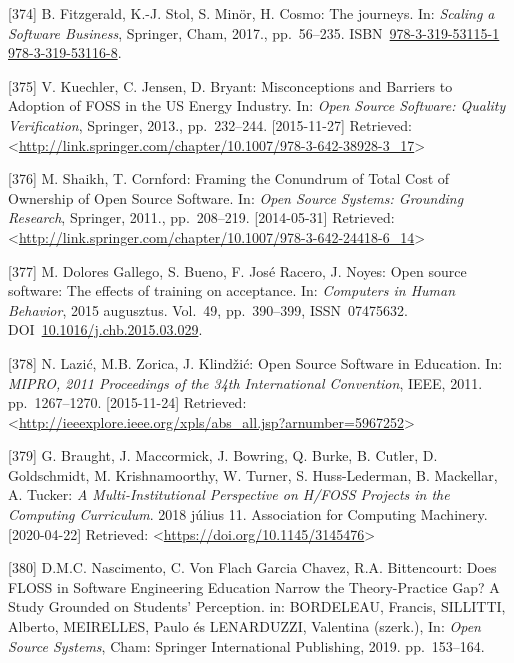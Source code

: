 \documentclass[12pt,magyar,a4paper,oneside]{scrreprt}
\newenvironment{cslreferences}%
  {}%
  {\par}
\begin{document}
\begin{cslreferences}
\leavevmode\hypertarget{ref-fitzgerald_journeys_2017}{}%
{[}374{]} B. Fitzgerald, K.-J. Stol, S. Minör, H. Cosmo: The journeys.
In: \emph{Scaling a Software Business}, Springer, Cham, 2017.,
pp.~56--235.
ISBN~\href{https://worldcat.org/isbn/978-3-319-53115-1\%20978-3-319-53116-8}{978-3-319-53115-1 978-3-319-53116-8}.

\leavevmode\hypertarget{ref-kuechler_misconceptions_2013}{}%
{[}375{]} V. Kuechler, C. Jensen, D. Bryant: Misconceptions and Barriers
to Adoption of FOSS in the US Energy Industry. In: \emph{Open Source
Software: Quality Verification}, Springer, 2013., pp.~232--244.
{[}2015-11-27{]} Retrieved:
\textless{}\url{http://link.springer.com/chapter/10.1007/978-3-642-38928-3_17}\textgreater{}

\leavevmode\hypertarget{ref-shaikh_framing_2011}{}%
{[}376{]} M. Shaikh, T. Cornford: Framing the Conundrum of Total Cost of
Ownership of Open Source Software. In: \emph{Open Source Systems:
Grounding Research}, Springer, 2011., pp.~208--219. {[}2014-05-31{]}
Retrieved:
\textless{}\url{http://link.springer.com/chapter/10.1007/978-3-642-24418-6_14}\textgreater{}

\leavevmode\hypertarget{ref-dolores_gallego_open_2015}{}%
{[}377{]} M. Dolores Gallego, S. Bueno, F. José Racero, J. Noyes: Open
source software: The effects of training on acceptance. In:
\emph{Computers in Human Behavior}, 2015 augusztus. Vol.~49,
pp.~390--399, ISSN~07475632.
DOI~\href{https://doi.org/10.1016/j.chb.2015.03.029}{10.1016/j.chb.2015.03.029}.

\leavevmode\hypertarget{ref-lazic_open_2011}{}%
{[}378{]} N. Lazić, M.B. Zorica, J. Klindžić: Open Source Software in
Education. In: \emph{MIPRO, 2011 Proceedings of the 34th International
Convention}, IEEE, 2011. pp.~1267--1270. {[}2015-11-24{]} Retrieved:
\textless{}\url{http://ieeexplore.ieee.org/xpls/abs_all.jsp?arnumber=5967252}\textgreater{}

\leavevmode\hypertarget{ref-braught_multi-institutional_2018}{}%
{[}379{]} G. Braught, J. Maccormick, J. Bowring, Q. Burke, B. Cutler, D.
Goldschmidt, M. Krishnamoorthy, W. Turner, S. Huss-Lederman, B.
Mackellar, A. Tucker: \emph{A Multi-Institutional Perspective on H/FOSS
Projects in the Computing Curriculum}. 2018 július 11. Association for
Computing Machinery. {[}2020-04-22{]} Retrieved:
\textless{}\url{https://doi.org/10.1145/3145476}\textgreater{}

\leavevmode\hypertarget{ref-nascimento_does_2019}{}%
{[}380{]} D.M.C. Nascimento, C. Von Flach Garcia Chavez, R.A.
Bittencourt: Does FLOSS in Software Engineering Education Narrow the
Theory-Practice Gap? A Study Grounded on Students' Perception. in:
BORDELEAU, Francis, SILLITTI, Alberto, MEIRELLES, Paulo és LENARDUZZI,
Valentina (szerk.), In: \emph{Open Source Systems}, Cham: Springer
International Publishing, 2019. pp.~153--164.


\end{cslreferences}
\end{document}
